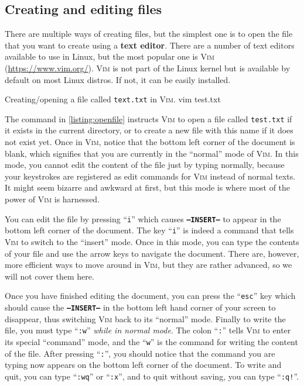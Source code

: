   \subsection{Creating and editing files}

    There are multiple ways of creating files, but the simplest one is to open the file that you want to create using a \textbf{text editor}.
    There are a number of text editors available to use in Linux, but the most popular one is \textsc{Vim} (\href{https://www.vim.org/}{https://www.vim.org/}).
    \textsc{Vim} is not part of the Linux kernel but is available by default on most Linux distros.
    If not, it can be easily installed.

    \begin{bashcmd}[label=listing:openfile]{Creating/opening a file called \texttt{text.txt} in \textsc{Vim}.}
      vim test.txt
    \end{bashcmd}

    The command in \cref{listing:openfile} instructs \textsc{Vim} to open a file called \texttt{test.txt} if it exists in the current directory, or to create a new file with this name if it does not exist yet.
    Once in \textsc{Vim}, notice that the bottom left corner of the document is blank, which signifies that you are currently in the \enquote{normal} mode of \textsc{Vim}.
    In this mode, you cannot edit the content of the file just by typing normally, because your keystrokes are registered as edit commands for \textsc{Vim} instead of normal texts.
    It might seem bizarre and awkward at first, but this mode is where most of the power of \textsc{Vim} is harnessed.

    You can edit the file by pressing \enquote{\texttt{i}} which causes \textbf{\texttt{--INSERT--}} to appear in the bottom left corner of the document.
    The key \enquote{\texttt{i}} is indeed a command that tells \textsc{Vim} to switch to the \enquote{insert} mode.
    Once in this mode, you can type the contents of your file and use the arrow keys to navigate the document.
    There are, however, more efficient ways to move around in \textsc{Vim}, but they are rather advanced, so we will not cover them here.

    Once you have finished editing the document, you can press the \enquote{\texttt{esc}} key which should cause the \textbf{\texttt{--INSERT--}} in the bottom left hand corner of your screen to disappear, thus switching \textsc{Vim} back to its \enquote{normal} mode.
    Finally to write the file, you must type \enquote{\texttt{:w}} \emph{while in normal mode}.
    The colon \enquote{\texttt{:}} tells \textsc{Vim} to enter its special \enquote{command} mode, and the \enquote{\texttt{w}} is the command for writing the content of the file.
    After pressing \enquote{\texttt{:}}, you should notice that the command you are typing now appears on the bottom left corner of the document.
    To write and quit, you can type \enquote{\texttt{:wq}} or \enquote{\texttt{:x}}, and to quit without saving, you can type \enquote{\texttt{:q!}}.

